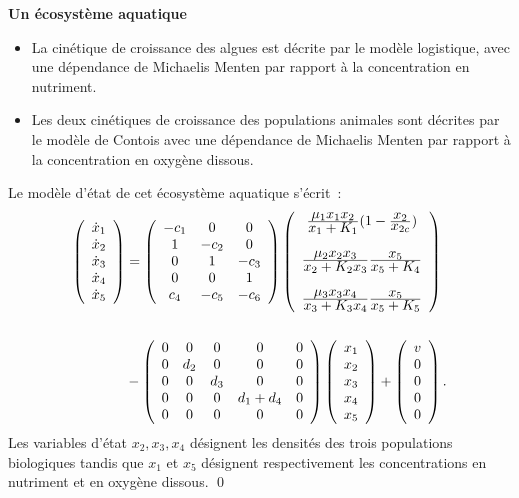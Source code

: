\begin{exemple} {\bf Un écosystème aquatique}
\begin{itemize}
\item La cinétique de croissance des
algues est décrite par le modèle logistique, avec une dépendance de
Michaelis Menten par rapport à la concentration en nutriment. 
\item Les deux
cinétiques de croissance des populations animales sont décrites par le
modèle de Contois avec une dépendance de Michaelis Menten par rapport
à la concentration en oxygène dissous. 
\end{itemize} 
Le modèle d'état de
cet écosystème aquatique s'écrit~: 
\begin{equation*} \begin{split}
\bma{c}  \dot x_1 \\ \dot x_2 \\
\dot x_3 \\ \dot x_4 \\ \dot x_5 \ema &= \bma{ccc} -c_1 & 0 & 0\\ 1 & -c_2
& 0 \\ 0 & 1 & -c_3 \\ 0 & 0 & 1 \\ c_4 & -c_5 & -c_6 \ema \bma{c}
\frac{{\textstyle \mu_1 x_1 x_2}}{{\textstyle x_1 + K_1}}(1 -
\frac{{\textstyle x_2}}{{\textstyle x_{2c}}}) \\ 
\\
\frac{{\textstyle \mu_2 x_2 x_3}}{{\textstyle x_2 + K_2x_3}}  \frac{{\textstyle
x_5}}{{\textstyle x_5 +K_4}} \\
\\
\frac{{\textstyle \mu_3 x_3 x_4}}{{\textstyle x_3 + K_3x_4}} \frac{{\textstyle
x_5}}{{\textstyle x_5 +K_5}}
\ema 
\\ & \\&- \bma{ccccc} 0 & 0 & 0 &
0 & 0 \\ 0 & d_2 & 0 & 0 & 0 \\0 & 0 & d_3 & 0 & 0  \\0 & 0 & 0 & d_1 + d_4 & 0
\\0 & 0 & 0 & 0 & 0
\ema \bma{c} x_1 \\  x_2 \\  x_3 \\  x_4 \\ x_5 \ema + \bma{c} v \\ 0  \\ 0 \\
0 \\ 0 \ema.    
\end{split} \end{equation*}
Les variables d'état
$x_2,x_3,x_4$ désignent les densités des trois populations biologiques
tandis que $x_1$ et $x_5$ désignent respectivement les concentrations en
nutriment et en oxygène dissous. \qed
\end{exemple}
 
